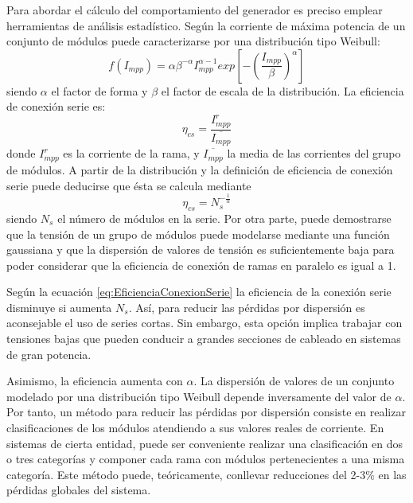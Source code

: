 Para abordar el cálculo del comportamiento del generador es preciso
emplear herramientas de análisis estadístico. Según \citep{Zilles1993}
la corriente de máxima potencia de un conjunto de módulos puede caracterizarse
por una distribución tipo Weibull:\begin{equation}
f(I_{mpp})=\alpha\beta^{-\alpha}I_{mpp}^{\alpha-1}exp\left[-\left(\frac{I_{mpp}}{\beta}\right)^{\alpha}\right]\end{equation}
siendo $\alpha$ el factor de forma y $\beta$ el factor de escala
de la distribución. La eficiencia de conexión serie es:\begin{equation}
\eta_{cs}=\frac{I_{mpp}^{r}}{\overline{I_{mpp}}}\end{equation}
donde
$I_{mpp}^{r}$ es la corriente de la rama, y $\overline{I_{mpp}}$
la media de las corrientes del grupo de módulos. A partir de la distribución
y la definición de eficiencia de conexión serie puede deducirse que
ésta se calcula mediante\begin{equation}
\eta_{cs}=N_{s}^{-\frac{1}{\alpha}}\label{eq:EficienciaConexionSerie}\end{equation}
siendo $N_{s}$ el número de módulos en la serie. Por otra parte,
puede demostrarse que la tensión de un grupo de módulos puede modelarse
mediante una función gaussiana y que la dispersión de valores de tensión
es suficientemente baja para poder considerar que la eficiencia de
conexión de ramas en paralelo es igual a 1. 

Según la ecuación \ref{eq:EficienciaConexionSerie} la eficiencia
de la conexión serie disminuye si aumenta $N_{s}$. Así, para reducir
las pérdidas por dispersión es aconsejable el uso de series cortas.
Sin embargo, esta opción implica trabajar con tensiones bajas que
pueden conducir a grandes secciones de cableado en sistemas de gran
potencia. 

Asimismo, la eficiencia aumenta con $\alpha$. La dispersión de valores
de un conjunto modelado por una distribución tipo Weibull depende
inversamente del valor de $\alpha$. Por tanto, un método para reducir
las pérdidas por dispersión consiste en realizar clasificaciones de
los módulos atendiendo a sus valores reales de corriente. En sistemas
de cierta entidad, puede ser conveniente realizar una clasificación
en dos o tres categorías y componer cada rama con módulos pertenecientes
a una misma categoría. Este método puede, teóricamente, conllevar
reducciones del 2-3\% en las pérdidas globales del sistema. 

